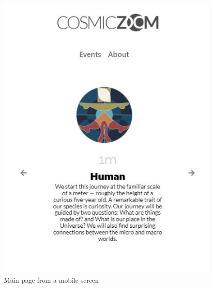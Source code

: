 \begin{figure}[h]
	\begin{center}
		\includegraphics[scale=0.3]{Figures/mob-1.JPG}
		\caption{Main page from a mobile screen}
		\label{fig:rb}
	\end{center}
\end{figure}

